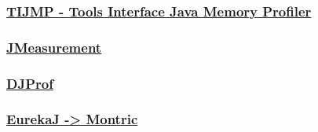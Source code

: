 \subsubsection{\href{http://www.khelekore.org/jmp/tijmp/}{TIJMP - Tools Interface Java Memory Profiler}}



\subsubsection{\href{https://sourceforge.net/projects/jmeasurement2/}{JMeasurement}}



\subsubsection{\href{http://homepages.mcs.vuw.ac.nz/~djp/djprof/}{DJProf}}



\subsubsection{\href{https://github.com/joachimhs/Montric}{EurekaJ -> Montric}}



